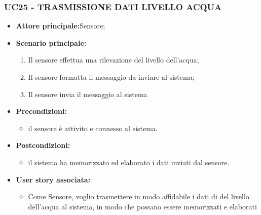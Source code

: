 \subsubsection{UC25 - TRASMISSIONE DATI LIVELLO ACQUA}
\begin{itemize}
    \item \textbf{Attore principale:}Sensore;
    \item \textbf{Scenario principale:}
          \begin{enumerate}
              \item Il sensore effettua una rilevazione del livello dell'acqua;
              \item Il sensore formatta il messaggio da inviare al sistema;
              \item Il sensore invia il messaggio al sistema
          \end{enumerate}
    \item \textbf{Precondizioni:}
          \begin{itemize}
              \item  il sensore è attivito e connesso al sistema. 
          \end{itemize}
    \item \textbf{Postcondizioni:}
          \begin{itemize}
              \item  il sistema ha memorizzato ed elaborato i dati inviati dal sensore.
          \end{itemize}
    \item \textbf{User story associata:}
          \begin{itemize}
            \item  Come Sensore, voglio trasmettere in modo affidabile i dati di del livello dell'acqua al sistema, in modo che possano essere memorizzati e elaborati 
          \end{itemize}
\end{itemize}
